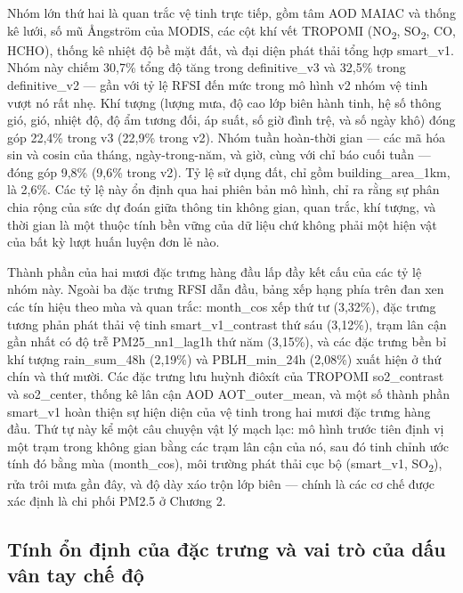 Nhóm lớn thứ hai là quan trắc vệ tinh trực tiếp, gồm tâm AOD MAIAC và thống kê lưới, số mũ Ångström của MODIS, các cột khí vết TROPOMI (NO\textsubscript{2}, SO\textsubscript{2}, CO, HCHO), thống kê nhiệt độ bề mặt đất, và đại diện phát thải tổng hợp smart\_v1. Nhóm này chiếm 30,7\% tổng độ tăng trong definitive\_v3 và 32,5\% trong definitive\_v2 --- gần với tỷ lệ RFSI đến mức trong mô hình v2 nhóm vệ tinh vượt nó rất nhẹ. Khí tượng (lượng mưa, độ cao lớp biên hành tinh, hệ số thông gió, gió, nhiệt độ, độ ẩm tương đối, áp suất, số giờ đình trệ, và số ngày khô) đóng góp 22,4\% trong v3 (22,9\% trong v2). Nhóm tuần hoàn-thời gian --- các mã hóa sin và cosin của tháng, ngày-trong-năm, và giờ, cùng với chỉ báo cuối tuần --- đóng góp 9,8\% (9,6\% trong v2). Tỷ lệ sử dụng đất, chỉ gồm building\_area\_1km, là 2,6\%. Các tỷ lệ này ổn định qua hai phiên bản mô hình, chỉ ra rằng sự phân chia rộng của sức dự đoán giữa thông tin không gian, quan trắc, khí tượng, và thời gian là một thuộc tính bền vững của dữ liệu chứ không phải một hiện vật của bất kỳ lượt huấn luyện đơn lẻ nào.

Thành phần của hai mươi đặc trưng hàng đầu lấp đầy kết cấu của các tỷ lệ nhóm này. Ngoài ba đặc trưng RFSI dẫn đầu, bảng xếp hạng phía trên đan xen các tín hiệu theo mùa và quan trắc: month\_cos xếp thứ tư (3,32\%), đặc trưng tương phản phát thải vệ tinh smart\_v1\_contrast thứ sáu (3,12\%), trạm lân cận gần nhất có độ trễ PM25\_nn1\_lag1h thứ năm (3,15\%), và các đặc trưng bền bỉ khí tượng rain\_sum\_48h (2,19\%) và PBLH\_min\_24h (2,08\%) xuất hiện ở thứ chín và thứ mười. Các đặc trưng lưu huỳnh điôxít của TROPOMI so2\_contrast và so2\_center, thống kê lân cận AOD AOT\_outer\_mean, và một số thành phần smart\_v1 hoàn thiện sự hiện diện của vệ tinh trong hai mươi đặc trưng hàng đầu. Thứ tự này kể một câu chuyện vật lý mạch lạc: mô hình trước tiên định vị một trạm trong không gian bằng các trạm lân cận của nó, sau đó tinh chỉnh ước tính đó bằng mùa (month\_cos), môi trường phát thải cục bộ (smart\_v1, SO\textsubscript{2}), rửa trôi mưa gần đây, và độ dày xáo trộn lớp biên --- chính là các cơ chế được xác định là chi phối PM2.5 ở Chương 2.

\subsection{Tính ổn định của đặc trưng và vai trò của dấu vân tay chế độ}

